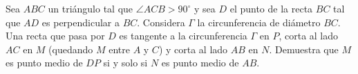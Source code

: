 Sea $ABC$ un triángulo tal que $\angle ACB>90^{\circ}$ y sea $D$ el punto de la recta $BC$ tal que $AD$ es perpendicular a $BC$. Considera $\Gamma$ la circunferencia de diámetro $BC$. Una recta que pasa por $D$ es tangente a la circunferencia $\Gamma$ en $P$, corta al lado $AC$ en $M$ (quedando $M$ entre $A$ y $C$) y corta al lado $AB$ en $N$. Demuestra que $M$ es punto medio de $DP$ si y solo si $N$ es punto medio de $AB$.